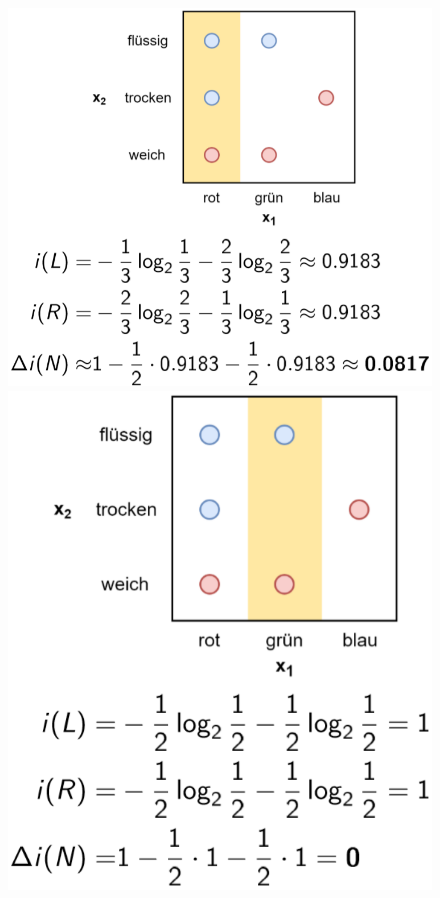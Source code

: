 \documentclass{report}
\begin{document}
  \begin{figure}[H]	
    \centering	
    \begin{minipage}[b]{0.4\textwidth}	
      \includegraphics[scale=.235]{ml07_8}	
    \end{minipage}	
    \begin{minipage}[b]{0.4\textwidth}	
      \includegraphics[scale=.235]{ml07_9}	
    \end{minipage}	
  \end{figure}	
  
\end{document}
